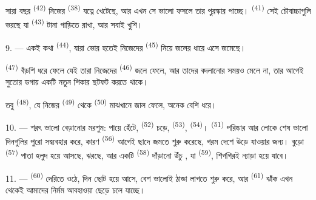 সারা বছর  \textsuperscript{(42)} নিজের 
\textsuperscript{(38)} যত্নে খেটেছে, আর এখন সে ভালো ফসলে তার পুরস্কার পাচ্ছে।
 \textsuperscript{(41)} সেই চৌবাচ্চাগুলি ভরছে যা
 \textsuperscript{(43)} টানা গাড়িতে রাখা, আর সবাই খুশি।

\VUsaut{5.0mm}
\VUsaut{3.4mm}

9. --- একই কথা  \textsuperscript{(44)}, যারা ভোর হতেই
নিজেদের  \textsuperscript{(45)} নিয়ে জলের ধারে এসে জমেছে।

 \textsuperscript{(47)} বঁড়শি ধরে ফেলে যেই তারা নিজেদের
 \textsuperscript{(46)} জলে ফেলে, আর তাদের  বদলানোর
সময়ও মেলে না, তার আগেই সুতোর ডগায় একটি নতুন শিকার ছটফট করতে থাকে।

তবু  \textsuperscript{(48)}, যে নিজের 
\textsuperscript{(49)} থেকে  \textsuperscript{(50)} মাঝখানে জাল
ফেলে, অনেক বেশি ধরে।

10. --- শরৎ ভালো বেড়ানোর মরশুম: পায়ে হেঁটে, 
\textsuperscript{(52)} চড়ে,  \textsuperscript{(53)},
 \textsuperscript{(54)}।  \textsuperscript{(51)}
পরিষ্কার আর লোকে শেষ ভালো দিনগুলির পুরো সদ্ব্যবহার করে, কারণ
 \textsuperscript{(56)} আগেই ছাদে জমতে শুরু করেছে, গরম দেশে উড়ে
যাওয়ার জন্য। বুড়ো  \textsuperscript{(57)} পাতা হলুদ হয়ে
আসছে,  ঝরছে, আর একটি  \textsuperscript{(58)} দাঁড়ানো
উঁচু , যা  \textsuperscript{(59)}, শিগগিরই ন্যাড়া
হয়ে যাবে।

11. ---  \textsuperscript{(60)} দেরিতে ওঠে, দিন ছোট হয়ে আসে,
 বেশ ভালোই ঠান্ডা লাগতে শুরু করে, আর 
\textsuperscript{(61)} ঝাঁক এখন থেকেই আমাদের নির্মম আবহাওয়া ছেড়ে চলে যাচ্ছে।
\VUsaut{6.0mm}
\VUfilet{22mm}
